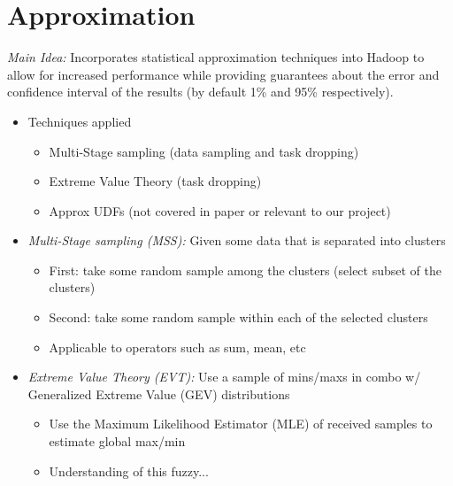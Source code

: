 


\section{Approximation}


\emph{Main Idea:} Incorporates statistical approximation techniques into
Hadoop to allow for increased performance while providing guarantees about
the error and confidence interval of the results (by default 1\% and 95\%
respectively).
\begin{itemize}

    \item Techniques applied
    \begin{itemize}
        \item Multi-Stage sampling (data sampling and task dropping)
        \item Extreme Value Theory (task dropping)
        \item Approx UDFs (not covered in paper or relevant to our project)
    \end{itemize}

    \item \emph{Multi-Stage sampling (MSS):} Given some data that is separated
      into clusters
    \begin{itemize}
        \item First: take some random sample among the clusters (select subset
          of the clusters)
        \item Second: take some random sample within each of the selected
          clusters
        \item Applicable to operators such as sum, mean, etc
    \end{itemize} 

    \item \emph{Extreme Value Theory (EVT):} Use a sample of mins/maxs in combo
      w/ Generalized Extreme Value (GEV) distributions
    \begin{itemize}
        \item Use the Maximum Likelihood Estimator (MLE) of received samples to
          estimate global max/min
        \item Understanding of this fuzzy...
    \end{itemize}


\end{itemize}
